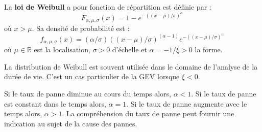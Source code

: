 \begin{f}


La \textbf{loi de Weibull} a pour fonction de répartition est définie par :
\[
F_{\alpha,\mu, \sigma}(x) = 1- e^{-((x-\mu)/\sigma)^\alpha}\,
\]
où \(x >\mu\).
Sa densité de probabilité est :
\[
f_{\alpha,\mu,\sigma}(x) = (\alpha/\sigma) ((x-\mu)/\sigma)^{(\alpha-1)} e^{-((x-\mu)/\sigma)^\alpha}\,
\]
où  \(\mu\in\mathbb{R}\) est la localisation, \(\sigma>0\) d'échelle et  \(\alpha=-1/\xi>0 \) la forme.

La distribution de Weibull est souvent utilisée dans le domaine de l'analyse de la durée de vie. C'est un cas particulier de la GEV lorsque \(\xi<0\).

Si le taux de panne diminue au cours du temps alors, \(\alpha<1\). Si le taux de panne est constant dans le temps alors, \(\alpha=1\). Si le taux de panne augmente avec le temps alors, \(\alpha>1\). La compréhension du taux de panne peut fournir une indication au sujet de la cause des pannes.


\begin{center}
	{\shorthandoff{:!;}	  
}
\end{center}
\end{f}


